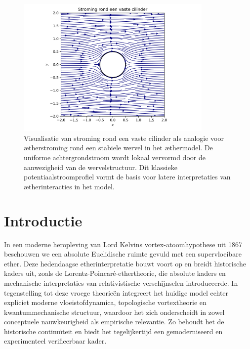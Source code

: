 \begin{figure}[htbp]
    \centering
    \includegraphics[width=0.85\textwidth]{../02_cylinder_flow}
    \caption{Visualisatie van stroming rond een vaste cilinder als analogie voor ætherstroming rond een stabiele wervel in het æthermodel. De uniforme achtergrondstroom wordt lokaal vervormd door de aanwezigheid van de wervelstructuur. Dit klassieke potentiaalstroomprofiel vormt de basis voor latere interpretaties van ætherinteracties in het model.}
    \label{fig:cylinderflow}
\end{figure}

\section{Introductie}
In een moderne heropleving van Lord Kelvins vortex-atoomhypothese uit 1867~\cite{Kelvin1867-vortex} beschouwen we een absolute Euclidische ruimte gevuld met een supervloeibare ether. Deze hedendaagse etherinterpretatie bouwt voort op en breidt historische kaders uit, zoals de Lorentz-Poincaré-ethertheorie, die absolute kaders en mechanische interpretaties van relativistische verschijnselen introduceerde. In tegenstelling tot deze vroege theorieën integreert het huidige model echter expliciet moderne vloeistofdynamica, topologische vortextheorie en kwantummechanische structuur, waardoor het zich onderscheidt in zowel conceptuele nauwkeurigheid als empirische relevantie. Zo behoudt het de historische continuïteit en biedt het tegelijkertijd een gemoderniseerd en experimenteel verifieerbaar kader.


